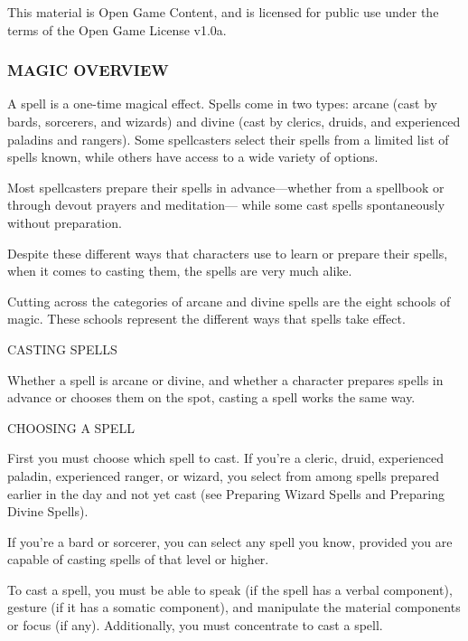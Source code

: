 \documentclass{article}
\begin{document}
This material is Open Game Content, and is licensed for public use under the terms 
of the Open Game License v1.0a.

\subsubsection*{{\LARGE{}MAGIC OVERVIEW}}

\vspace{12pt}
A spell is a one-time magical effect. Spells come in two types: arcane (cast by 
bards, sorcerers, and wizards) and divine (cast by clerics, druids, and experienced 
paladins and rangers). Some spellcasters select their spells from a limited list 
of spells known, while others have access to a wide variety of options.

Most spellcasters prepare their spells in advance---whether from a spellbook or 
through devout prayers and meditation--- while some cast spells spontaneously without 
preparation.

Despite these different ways that characters use to learn or prepare their spells, 
when it comes to casting them, the spells are very much alike.

Cutting across the categories of arcane and divine spells are the eight schools 
of magic. These schools represent the different ways that spells take effect.

\vspace{12pt}
{\LARGE{}CASTING SPELLS}

Whether a spell is arcane or divine, and whether a character prepares spells in 
advance or chooses them on the spot, casting a spell works the same way.

\vspace{12pt}
CHOOSING A SPELL

First you must choose which spell to cast. If you're a cleric, druid, experienced 
paladin, experienced ranger, or wizard, you select from among spells prepared earlier 
in the day and not yet cast (see Preparing Wizard Spells and Preparing Divine Spells).

If you're a bard or sorcerer, you can select any spell you know, provided you are 
capable of casting spells of that level or higher.

To cast a spell, you must be able to speak (if the spell has a verbal component), 
gesture (if it has a somatic component), and manipulate the material components 
or focus (if any). Additionally, you must concentrate to cast a spell.
\end{document}
